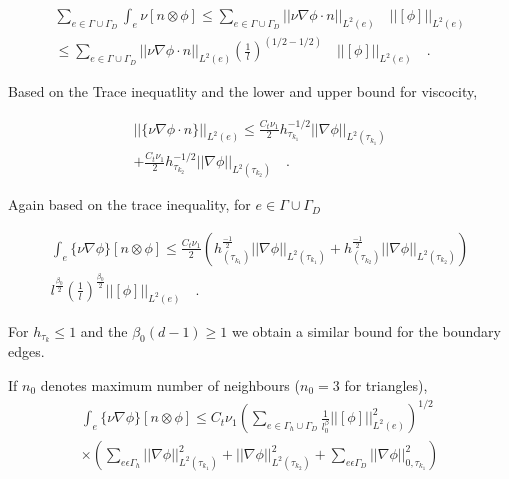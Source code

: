 \documentclass[a4paper,openany]{book}
\begin{document}
\begin{equation}
\begin{split}
\sum_{e \in \Gamma \cup \Gamma_D} \int_e {\nu}[n \otimes \phi] \leq \sum_{e \in \Gamma \cup \Gamma_D} ||\nu \nabla \phi \cdot n||_{L^2(e)} \quad ||[\phi]||_{L^2(e)} \\ \leq \sum_{e \in \Gamma \cup \Gamma_D} ||\nu \nabla \phi \cdot n||_{L^2(e)} (\frac{1}{l})^{(1/2-1/2)} \quad ||[\phi]||_{L^2(e)} \quad \textrm{.}
\end{split}
\end{equation}

Based on the Trace inequatlity and the lower and upper bound for viscocity, 

\begin{equation}
\begin{split}
||\lbrace \nu \nabla \phi \cdot n \rbrace||_{L^2(e)} \leq \frac{C_t \nu_1}{2} {h_{\tau_{k_1}}^{-1/2}} ||\nabla \phi||_{L^2({\tau_{k_1}})} \\ + \frac{C_t \nu_1}{2} {h_{{\tau_{k_2}}}^{-1/2}} ||\nabla \phi||_{L^2({\tau_{k_2}})} \quad \textrm{.}
\end{split}
\end{equation}

Again based on the trace inequality, for $e \in \Gamma \cup \Gamma_D$

\begin{equation}
\begin{split}
\int_e \lbrace \nu \nabla \phi \rbrace [n \otimes \phi] \leq \frac{C_t \nu_1}{2}  \left( h_{(\tau_{k_1})}^{\frac{-1}{2}} ||\nabla \phi||_{L^2{(\tau_{k_1})}} + {h_{(\tau_{k_2})}^{\frac{-1}{2}}} ||\nabla \phi||_{L^2{(\tau_{k_2})}} \right) \\ l^{\frac{\beta_0}{2}} \left({\frac{1}{l}}\right)^{\frac{\beta_0}{2}} ||[\phi]||_{L^2(e)} \quad \textrm{.}
\end{split}
\end{equation}

For $h_{\tau_k} \leq 1$ and the $\beta_0 (d-1) \geq 1$ we obtain a similar bound for the boundary edges.

If $n_0$ denotes maximum number of neighbours ($n_0 = 3$ for triangles),
\begin{equation}
\begin{split}
\int_e \lbrace \nu \nabla \phi \rbrace[n \otimes \phi] \leq C_t \nu_1 \left( \sum_{e \in \Gamma_h \cup \Gamma_D} \frac{1}{l^\beta_0} ||[\phi]||^2_{L^2(e)} \right)^{1/2} \\ \times \left( \sum_{e \epsilon \Gamma_h} ||\nabla \phi||^2_{L^2(\tau_{k_1})} + ||\nabla \phi||^2_{L^2(\tau_{k_2})} + \sum_{e \epsilon \Gamma_D} ||\nabla \phi||^2_{0,\tau_{k_1}} \right)
\end{split}
\end{equation}
\end{document}
